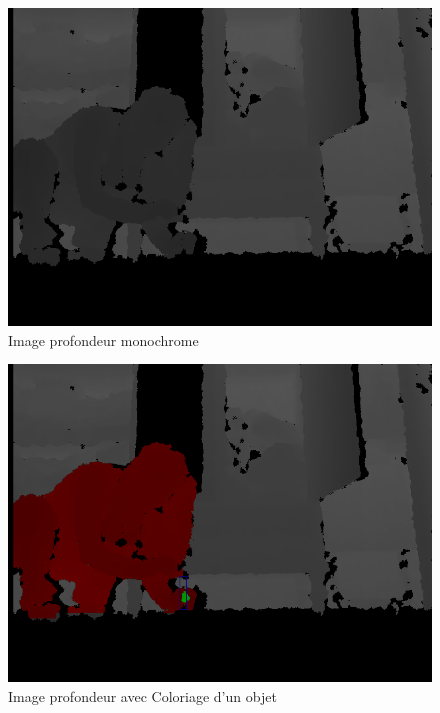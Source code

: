 \documentclass[12pt,a4paper,oneside]{book}
\begin{document}
	\begin{figure}[H]
		\centering
		\includegraphics[scale=0.5]{images/image2.png}
		\caption{Image profondeur monochrome}
		\label{fig1i}
	\end{figure}
	
	\begin{figure}[H]
		\centering
		\includegraphics[scale=0.5]{images/hassinapixelrouge3.png}
		\caption{Image profondeur avec Coloriage d'un objet}
		\label{fig1c}
	\end{figure}
	
\end{document}
